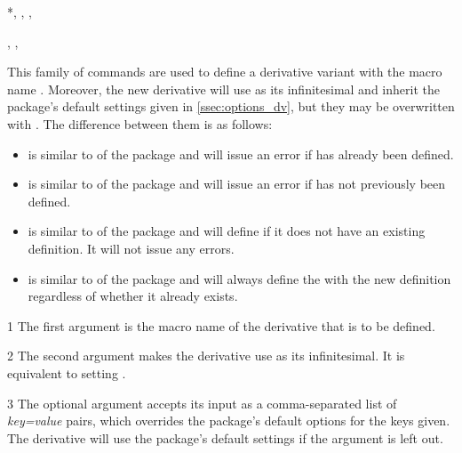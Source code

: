 	\begin{function}*{\NewDerivative, \RenewDerivative, \ProvideDerivative, \DeclareDerivative}
		\begin{syntax}
			, , 
		\end{syntax}
		This family of commands are used to define a derivative variant with the macro name . Moreover, the new derivative will use  as its infinitesimal and inherit the package's default settings given in \cref{ssec:options_dv}, but they may be overwritten with . The difference between them is as follows:
		\begin{itemize}
			\item {} is similar to  of the  package and will issue an error if  has already been defined.
			\item {} is similar to  of the  package and will issue an error if  has not previously been defined.
			\item {} is similar to  of the  package and will define  if it does not have an existing definition. It will not issue any errors.
			\item {} is similar to  of the  package and will always define the  with the new definition regardless of whether it already exists.
		\end{itemize}
		
		\begin{argument}{1}
			The first argument is the macro name of the derivative that is to be defined.
		\end{argument}
		
		\begin{argument}{2}
			The second argument makes the derivative  use  as its infinitesimal. It is equivalent to setting .
		\end{argument}
		
		\begin{argument}{3}
			The optional argument accepts its input as a comma-separated list of \emph{key=value} pairs, which overrides the package's default options for the keys given. The derivative  will use the package's default settings if the argument is left out.
		\end{argument}
	\end{function}
	
